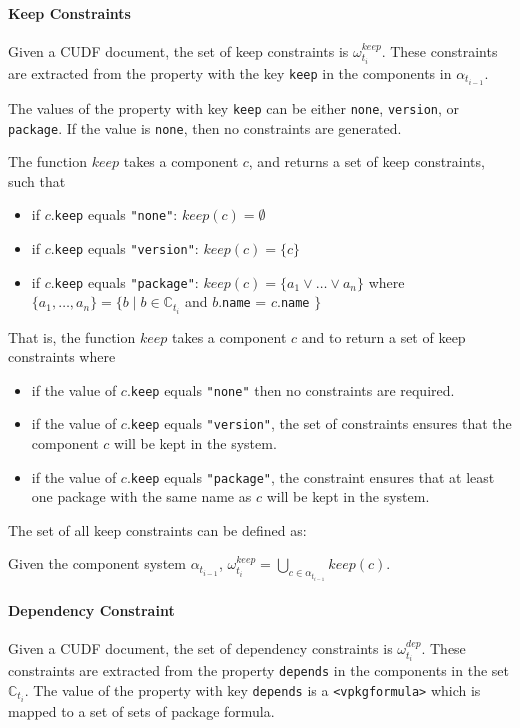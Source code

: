 \paragraph{Keep Constraints}
Given a CUDF document, the set of keep constraints is $\omega_{t_i}^{keep}$.
These constraints are extracted from the property with the key \texttt{keep} in the components in $\alpha_{t_{i-1}}$.
 
The values of the property with key \texttt{keep} can be either \texttt{none}, \texttt{version}, or \texttt{package}.
If the value is \texttt{none}, then no constraints are generated.
\begin{defs}
The function $keep$ takes a component $c$, and returns a set of keep constraints, such that
\begin{itemize}
	\item if $c$.\verb+keep+ equals \verb+"none"+: $keep(c) = \emptyset$
	\item if $c$.\verb+keep+ equals \verb+"version"+: $keep(c) = \{c\}$
	\item if $c$.\verb+keep+ equals \verb+"package"+: $keep(c) = \{a_1 \vee \ldots \vee a_n\}$ where $\{a_1,\ldots,a_n\} = \{b \mid b \in \mathbb{C}_{t_i}$ and $b.$\texttt{name} = $c.$\texttt{name} $\}$
\end{itemize}

\end{defs}
That is, the function $keep$ takes a component $c$ and to return a set of keep constraints where
\begin{itemize}
  \item if the value of $c$.\verb+keep+ equals \verb+"none"+ then no constraints are required.
  \item if the value of $c$.\verb+keep+ equals \verb+"version"+, the set of constraints ensures that the component $c$ will be kept in the system.
  \item if the value of $c$.\verb+keep+ equals \verb+"package"+, the constraint ensures that at least one package with the same name as $c$ will be kept in the system.
\end{itemize}

The set of all keep constraints can be defined as:
\begin{defs}
Given the component system $\alpha_{t_{i-1}}$, $\omega_{t_i}^{keep} = \bigcup \limits_{c \in \alpha_{t_{i-1}}} keep(c)$.
\end{defs}

\paragraph{Dependency Constraint}
Given a CUDF document, the set of dependency constraints is $\omega_{t_i}^{dep}$.
These constraints are extracted from the property \texttt{depends} in the components in the set $\mathbb{C}_{t_i}$.
The value of the property with key \texttt{depends} is a \texttt{<vpkgformula>} which is mapped to a set of sets of package formula.

